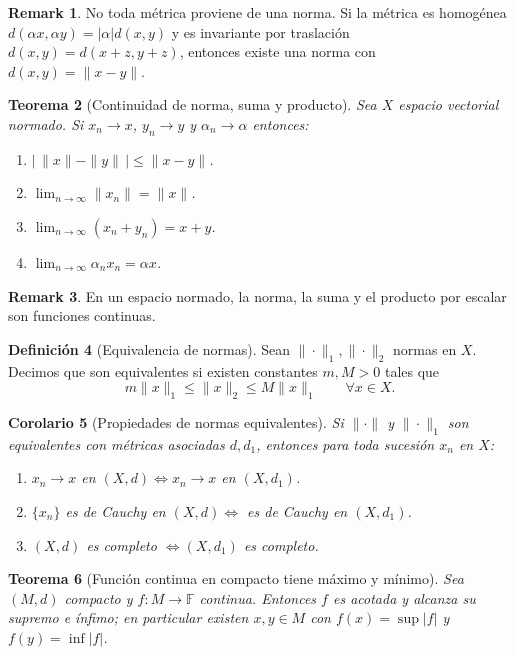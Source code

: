 \documentclass[11pt]{article}
\theoremstyle{definition}
\newtheorem{definition}{Definición}[section]
\newtheorem{remark}[definition]{Remark}
\theoremstyle{plain}
\newtheorem{theorem}[definition]{Teorema}
\newtheorem{corollary}[definition]{Corolario}
\begin{document}
\begin{remark}
No toda métrica proviene de una norma. Si la métrica es homogénea $d(\alpha x,\alpha y)=|\alpha|d(x,y)$ y es invariante por traslación $d(x,y)=d(x+z,y+z)$, entonces existe una norma con $d(x,y)=\|x-y\|$.
\end{remark}

\begin{theorem}[Continuidad de norma, suma y producto]
Sea $X$ espacio vectorial normado. Si $x_n\to x$, $y_n\to y$ y $\alpha_n\to\alpha$ entonces:
\begin{enumerate}[label=(\arabic*)]
\item $|\,\|x\|-\|y\|\,|\le\|x-y\|$.
\item $\lim_{n\to\infty}\|x_n\|=\|x\|$.
\item $\lim_{n\to\infty}(x_n+y_n)=x+y$.
\item $\lim_{n\to\infty}\alpha_n x_n=\alpha x$.
\end{enumerate}
\end{theorem}

\begin{remark}
En un espacio normado, la norma, la suma y el producto por escalar son funciones continuas.
\end{remark}

\begin{definition}[Equivalencia de normas]
Sean $\|\cdot\|_1,\|\cdot\|_2$ normas en $X$. Decimos que son equivalentes si existen constantes $m,M>0$ tales que
$$m\|x\|_1\le\|x\|_2\le M\|x\|_1\qquad\forall x\in X.$$ 
\end{definition}

\begin{corollary}[Propiedades de normas equivalentes]
Si $\|\cdot\|$ y $\|\cdot\|_1$ son equivalentes con métricas asociadas $d,d_1$, entonces para toda sucesión $x_n$ en $X$:
\begin{enumerate}[label=(\arabic*)]
\item $x_n\to x$ en $(X,d)\iff x_n\to x$ en $(X,d_1)$.
\item $\{x_n\}$ es de Cauchy en $(X,d)\iff$ es de Cauchy en $(X,d_1)$.
\item $(X,d)$ es completo $\iff (X,d_1)$ es completo.
\end{enumerate}
\end{corollary}

\begin{theorem}[Función continua en compacto tiene máximo y mínimo]
Sea $(M,d)$ compacto y $f:M\to\mathbb{F}$ continua. Entonces $f$ es acotada y alcanza su supremo e ínfimo; en particular existen $x,y\in M$ con $f(x)=\sup|f|$ y $f(y)=\inf|f|$.
\end{theorem}
\end{document}
